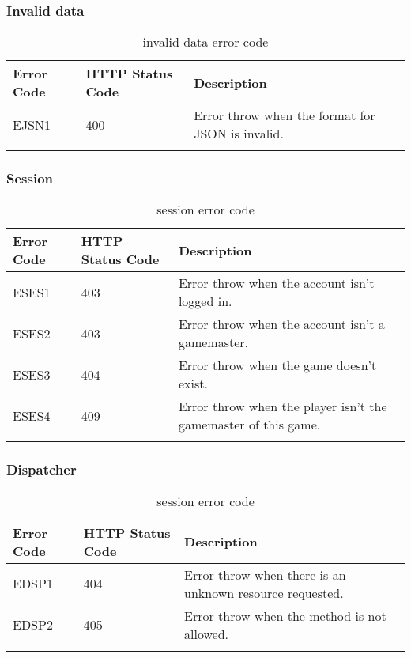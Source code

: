 \subsubsection{Invalid data}
\begin{longtable}{|p{}|p{} |p{}|} 
    \hline
    \textbf{Error Code} & \textbf{HTTP Status Code} & \textbf{Description} \\\hline
    EJSN1 & 400 & Error throw when the format for JSON is invalid.\\\hline
    \caption{invalid data error code}
    \label{tab:invalid_data_error_code}
\end{longtable}
\subsubsection{Session}
\begin{longtable}{|p{}|p{} |p{}|} 
    \hline
    \textbf{Error Code} & \textbf{HTTP Status Code} & \textbf{Description} \\\hline
    ESES1 & 403 & Error throw when the account isn't logged in.\\\hline
    ESES2 & 403 & Error throw when the account isn't a gamemaster.\\\hline
    ESES3 & 404 & Error throw when the game doesn't exist.\\\hline
    ESES4 & 409 & Error throw when the player isn't the gamemaster of this game.\\\hline
    \caption{session error code}
    \label{tab:session_error_code}
\end{longtable}
\subsubsection{Dispatcher}
\begin{longtable}{|p{}|p{} |p{}|} 
    \hline
    \textbf{Error Code} & \textbf{HTTP Status Code} & \textbf{Description} \\\hline
    EDSP1 & 404 & Error throw when there is an unknown resource requested.\\\hline
    EDSP2 & 405 & Error throw when the method is not allowed.\\\hline
    \caption{session error code}
    \label{tab:session_error_code}
\end{longtable}
